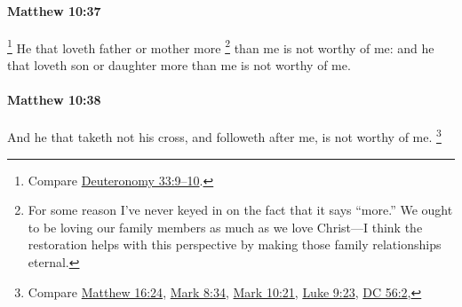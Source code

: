 		\paragraph{Matthew 10:37} %
			\label{MATTHEW-10-37}

				\footnote{%
					Compare \hyperref[DEUTERONOMY-33-9]{Deuteronomy 33:9--10}.
					}%
			He that loveth father or mother more%
				\footnote{%
					For some reason I've never keyed in on the fact that it says ``more.'' We ought to be loving our family members as much as we love Christ---I think the restoration helps with this perspective by making those family relationships eternal.
					}
			than me is not worthy of me: and he that loveth son or daughter more than me is not worthy of me.

			\begin{framed}
			\scriptsize
				\begin{compactdesc}
					\item[SBLG] 
				\end{compactdesc}
			\end{framed}

		\paragraph{Matthew 10:38} %
			\label{MATTHEW-10-38}

			And he that taketh not his cross, and followeth after me, is not worthy of me.%
				\footnote{%
					Compare \hyperref[MATTHEW-16-24]{Matthew 16:24}, \hyperref[MARK-8-34]{Mark 8:34}, \hyperref[MARK-10-21]{Mark 10:21}, \hyperref[LUKE-9-23]{Luke 9:23}, \hyperref[DC56-2]{DC 56:2}, 
					}

